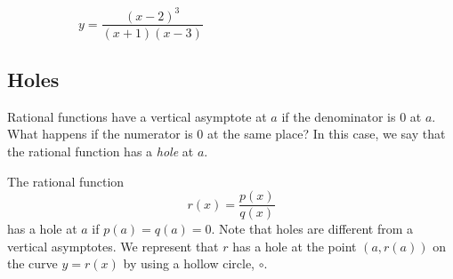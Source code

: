 \begin{figure}[!htb]
\begin{subfigure}{\figurewidth}
			 \caption{$y=\dfrac{(x-2)^3}{(x+1)(x-3)}$}
			 \label{rat:fig:repfactn3}
		 \end{subfigure}
		 \caption{}
		 \label{rat:fig:repfactn}
	 \end{figure}

 \subsection*{Holes}
	 Rational functions have a vertical asymptote at $a$ if the denominator is $0$ at $a$.
	 What happens if the numerator is $0$ at the same place? In this case, we say that the rational
	 function has a \emph{hole} at $a$.
	 \begin{pccdefinition}[Holes]
		 The rational function
		 \[
			 r(x)=\frac{p(x)}{q(x)}
		 \]
		 has a hole at $a$ if $p(a)=q(a)=0$. Note that holes are different from
		 a vertical asymptotes. We represent that $r$ has a hole at the point
		 $(a,r(a))$ on the curve $y=r(x)$ by
		 using a hollow circle, $\circ$.
	 \end{pccdefinition}

